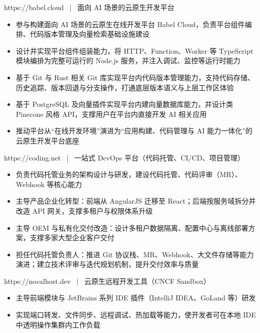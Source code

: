 \documentclass{resume}
\begin{document}
https://babel.cloud \ | \ 面向 AI 场景的云原生开发平台
\begin{onehalfspacing}
\begin{itemize}
  \item 参与构建面向 AI 场景的云原生在线开发平台 Babel Cloud，负责平台组件编排、代码版本管理及向量检索基础设施建设
  \item 设计并实现平台组件组装能力，将 HTTP、Function、Worker 等 TypeScript 模块编排为完整可运行的 Node.js 服务，并注入调试、监控等运行时能力
  \item 基于 Git 与 Rust 相关 Git 库实现平台内代码版本管理能力，支持代码存储、历史追踪、版本回退与分支操作，打通底层版本语义与上层工作区体验
  \item 基于 PostgreSQL 及向量插件实现平台内建向量数据库能力，并设计类 Pinecone 风格 API，支撑用户在平台内直接开发 AI 相关应用
  \item 推动平台从“在线开发环境”演进为“应用构建、代码管理与 AI 能力一体化”的云原生开发平台底座
\end{itemize}
\end{onehalfspacing}

https://coding.net \ | \ 一站式 DevOps 平台（代码托管、CI/CD、项目管理）
\begin{onehalfspacing}
\begin{itemize}
  \item 负责代码托管业务的架构设计与研发，建设代码托管、代码评审（MR）、Webhook 等核心能力
  \item 主导产品企业化转型：前端从 AngularJS 迁移至 React；后端按服务域拆分并改造 API 网关，支撑多租户与权限体系升级
  \item 主导 OEM 与私有化交付改造：设计多租户数据隔离、配置中心与离线部署方案，支撑多家大型企业客户交付
  \item 担任代码托管负责人：推进 Git 协议栈、MR、Webhook、大文件存储等能力演进；建立技术评审与迭代规划机制，提升交付效率与质量
\end{itemize}
\end{onehalfspacing}

https://nocalhost.dev \ | \ 云原生远程开发工具（CNCF Sandbox）
\begin{onehalfspacing}
\begin{itemize}
  \item 主导前端模块与 JetBrains 系列 IDE 插件（IntelliJ IDEA、GoLand 等）研发
  \item 实现端口转发、文件同步、远程调试、热加载等能力，使开发者可在本地 IDE 中透明操作集群内工作负载
\end{itemize}
\end{onehalfspacing}
\end{document}

